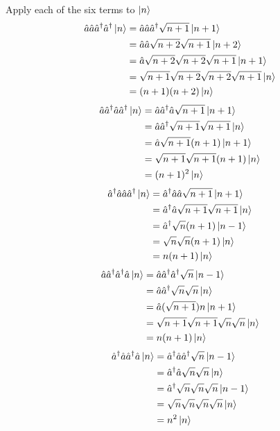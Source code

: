 \documentclass{amsart}
\begin{document}
Apply each of the six terms to $\ket{n}$
\begin{align*}
    \hat{a}\hat{a}\hat{a}^\dagger\hat{a}^\dagger\ket{n}&=\hat{a}\hat{a}\hat{a}^\dagger\sqrt{n+1}\ket{n+1}\\
    &=\hat{a}\hat{a}\sqrt{n+2}\sqrt{n+1}\ket{n+2}\\
    &=\hat{a}\sqrt{n+2}\sqrt{n+2}\sqrt{n+1}\ket{n+1}\\
    &=\sqrt{n+1}\sqrt{n+2}\sqrt{n+2}\sqrt{n+1}\ket{n}\\
    &=(n+1)(n+2)\ket{n}
\end{align*}
\begin{align*}
    \hat{a}\hat{a}^\dagger\hat{a}\hat{a}^\dagger\ket{n}&=\hat{a}\hat{a}^\dagger\hat{a}\sqrt{n+1}\ket{n+1}\\
    &=\hat{a}\hat{a}^\dagger\sqrt{n+1}\sqrt{n+1}\ket{n}\\
    &=\hat{a}\sqrt{n+1}(n+1)\ket{n+1}\\
    &=\sqrt{n+1}\sqrt{n+1}(n+1)\ket{n}\\
    &=(n+1)^2\ket{n}
\end{align*}
\begin{align*}
    \hat{a}^\dagger\hat{a}\hat{a}\hat{a}^\dagger\ket{n}&=\hat{a}^\dagger\hat{a}\hat{a}\sqrt{n+1}\ket{n+1}\\
    &=\hat{a}^\dagger\hat{a}\sqrt{n+1}\sqrt{n+1}\ket{n}\\
    &=\hat{a}^\dagger\sqrt{n}(n+1)\ket{n-1}\\
    &=\sqrt{n}\sqrt{n}(n+1)\ket{n}\\
    &=n(n+1)\ket{n}
\end{align*}
\begin{align*}
    \hat{a}\hat{a}^\dagger\hat{a}^\dagger\hat{a}\ket{n}&=\hat{a}\hat{a}^\dagger\hat{a}^\dagger\sqrt{n}\ket{n-1}\\
    &=\hat{a}\hat{a}^\dagger\sqrt{n}\sqrt{n}\ket{n}\\
    &=\hat{a}(\sqrt{n+1})n\ket{n+1}\\
    &=\sqrt{n+1}\sqrt{n+1}\sqrt{n}\sqrt{n}\ket{n}\\
    &=n(n+1)\ket{n}
\end{align*}
\begin{align*}
    \hat{a}^\dagger\hat{a}\hat{a}^\dagger\hat{a}\ket{n}&=\hat{a}^\dagger\hat{a}\hat{a}^\dagger\sqrt{n}\ket{n-1}\\
    &=\hat{a}^\dagger\hat{a}\sqrt{n}\sqrt{n}\ket{n}\\
    &=\hat{a}^\dagger\sqrt{n}\sqrt{n}\sqrt{n}\ket{n-1}\\
    &=\sqrt{n}\sqrt{n}\sqrt{n}\sqrt{n}\ket{n}\\
    &=n^2\ket{n}
\end{align*}
\end{document}
